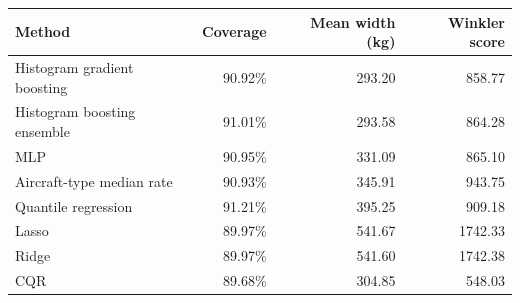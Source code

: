 \begin{tabular}{lrrr}
\toprule
Method & Coverage & Mean width (kg) & Winkler score \\
\midrule
Histogram gradient boosting & 90.92\% & 293.20 & 858.77 \\
Histogram boosting ensemble & 91.01\% & 293.58 & 864.28 \\
MLP & 90.95\% & 331.09 & 865.10 \\
Aircraft-type median rate & 90.93\% & 345.91 & 943.75 \\
Quantile regression & 91.21\% & 395.25 & 909.18 \\
Lasso & 89.97\% & 541.67 & 1742.33 \\
Ridge & 89.97\% & 541.60 & 1742.38 \\
CQR & 89.68\% & 304.85 & 548.03 \\
\bottomrule
\end{tabular}
